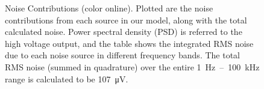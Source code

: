 \documentclass[aip,rsi,reprint]{revtex4-1} %
\begin{document}
\begin{figure}[t]

\caption{Noise Contributions (color online). Plotted are the noise contributions from each source in our model, along with the total calculated noise. Power spectral density (PSD) is referred to the high voltage output, and the table shows the integrated RMS noise due to each noise source in different frequency bands. The total RMS noise (summed in quadrature) over the entire \SI{1}{\hertz}~--~\SI{100}{\kilo\hertz} range is calculated to be \SI{107}{\micro\volt}. \label{Fig:NoisePlot}}
\end{figure}
\end{document}
